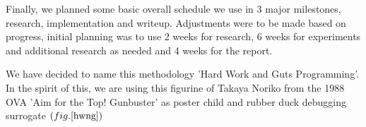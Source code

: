 Finally, we planned some basic overall schedule we use in 3 major milestones, research, implementation and writeup. Adjustments were to be made based on progress, initial planning was to use 2 weeks for research, 6 weeks for experiments and additional research as needed and 4 weeks for the report.

We have decided to name this methodology 'Hard Work and Guts Programming'. In the spirit of this, we are using this figurine of Takaya Noriko from the 1988 OVA 'Aim for the Top! Gunbuster' as poster child and rubber duck debugging surrogate $\left( fig. \ref{hwng} \right)$